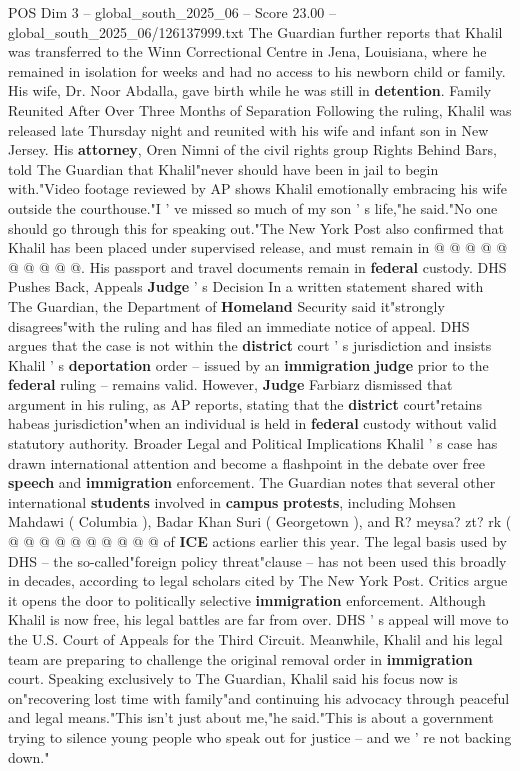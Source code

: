 \begin{textsample}{POS Dim 3 – global\_south\_2025\_06 – Score 23.00 – global\_south\_2025\_06/126137999.txt}
The Guardian further reports that Khalil was transferred to the Winn Correctional Centre in Jena, Louisiana, where he remained in isolation for weeks and had no access to his newborn child or family.
His wife, Dr.
Noor Abdalla, gave birth while he was still in \textbf{detention}.
Family Reunited After Over Three Months of Separation Following the ruling, Khalil was released late Thursday night and reunited with his wife and infant son in New Jersey.
His \textbf{attorney}, Oren Nimni of the civil rights group Rights Behind Bars, told The Guardian that Khalil"never should have been in jail to begin with."Video footage reviewed by AP shows Khalil emotionally embracing his wife outside the courthouse."I ' ve missed so much of my son ' s life,"he said."No one should go through this for speaking out."The New York Post also confirmed that Khalil has been placed under supervised release, and must remain in @ @ @ @ @ @ @ @ @ @.
His passport and travel documents remain in \textbf{federal} custody.
DHS Pushes Back, Appeals \textbf{Judge} ' s Decision In a written statement shared with The Guardian, the Department of \textbf{Homeland} Security said it"strongly disagrees"with the ruling and has filed an immediate notice of appeal.
DHS argues that the case is not within the \textbf{district} court ' s jurisdiction and insists Khalil ' s \textbf{deportation} order -- issued by an \textbf{immigration} \textbf{judge} prior to the \textbf{federal} ruling -- remains valid.
However, \textbf{Judge} Farbiarz dismissed that argument in his ruling, as AP reports, stating that the \textbf{district} court"retains habeas jurisdiction"when an individual is held in \textbf{federal} custody without valid statutory authority.
Broader Legal and Political Implications Khalil ' s case has drawn international attention and become a flashpoint in the debate over free \textbf{speech} and \textbf{immigration} enforcement.
The Guardian notes that several other international \textbf{students} involved in \textbf{campus} \textbf{protests}, including Mohsen Mahdawi ( Columbia ), Badar Khan Suri ( Georgetown ), and R? meysa? zt? rk ( @ @ @ @ @ @ @ @ @ @ of \textbf{ICE} actions earlier this year.
The legal basis used by DHS -- the so-called"foreign policy threat"clause -- has not been used this broadly in decades, according to legal scholars cited by The New York Post.
Critics argue it opens the door to politically selective \textbf{immigration} enforcement.
Although Khalil is now free, his legal battles are far from over.
DHS ' s appeal will move to the U.S.
Court of Appeals for the Third Circuit.
Meanwhile, Khalil and his legal team are preparing to challenge the original removal order in \textbf{immigration} court.
Speaking exclusively to The Guardian, Khalil said his focus now is on"recovering lost time with family"and continuing his advocacy through peaceful and legal means."This isn't just about me,"he said."This is about a government trying to silence young people who speak out for justice -- and we ' re not backing down."


\end{textsample}
